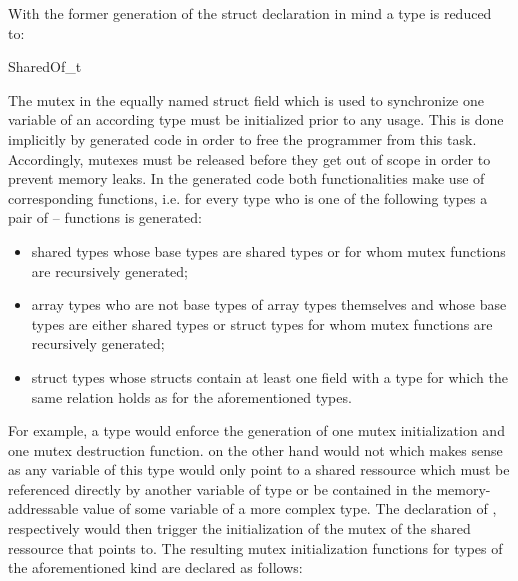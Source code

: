 With the former generation of the struct declaration in mind a type  is reduced to:
\begin{ccode}
SharedOf_t
\end{ccode}
The mutex in the equally named struct field which is used to synchronize one variable of an according type  must be initialized prior to any usage. This is done implicitly by generated code in order to free the programmer from this task. Accordingly, mutexes must be released before they get out of scope in order to prevent memory leaks. In the generated code both functionalities make use of corresponding functions, i.e. for every type who is one of the following types a pair of -- functions is generated:

\begin{itemize}
\item shared types whose base types are shared types or for whom mutex functions are recursively generated;
\item array types who are not base types of array types themselves and whose base types are either shared types or struct types for whom mutex functions are recursively generated;
\item struct types whose structs contain at least one field with a type for which the same relation holds as for the aforementioned types.
\end{itemize}

For example, a type  would enforce the generation of one mutex initialization and one mutex destruction function.  on the other hand would not which makes sense as any variable  of this type would only point to a shared ressource which must be referenced directly by another variable  of type  or be contained in the memory-addressable value of some variable  of a more complex type. The declaration of , respectively  would then trigger the initialization of the mutex of the shared ressource that  points to. The resulting mutex initialization functions for types of the aforementioned kind are declared as follows:

